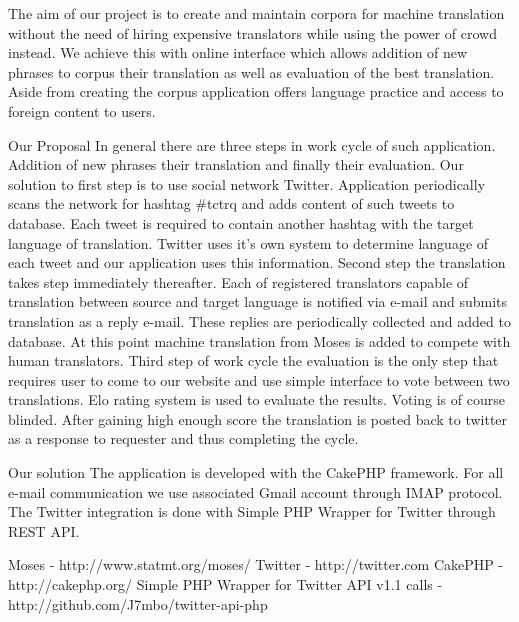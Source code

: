 The aim of our project is to create and maintain corpora for machine translation without the need of hiring expensive translators while using the power of crowd instead. We achieve this with online interface which allows addition of new phrases to corpus their translation as well as evaluation of the best translation. Aside from creating the corpus application offers language practice and access to foreign content to users.

Our Proposal
In general there are three steps in work cycle of such application. Addition of new phrases their translation and finally their evaluation. Our solution to first step is to use social network Twitter. Application periodically scans the network for hashtag #tctrq and adds content of such tweets to database. Each tweet is required to contain another hashtag with the target language of translation. Twitter uses it's own system to determine language of each tweet and our application uses this information. 
Second step the translation takes step immediately thereafter. Each of registered translators capable of translation between source and target language is notified via e-mail and submits translation as a reply e-mail. These replies are periodically collected and added to database. At this point machine translation from Moses is added to compete with human translators. 
Third step of work cycle the evaluation is the only step that requires user to come to our website and use simple interface to vote between two translations. Elo rating system is used to evaluate the results. Voting is of course blinded. After gaining high enough score the translation is posted back to twitter as a response to requester and thus completing the cycle. 

Our solution
The application is developed with the CakePHP framework. For all e-mail communication we use associated Gmail account through IMAP protocol. The Twitter integration is done with Simple PHP Wrapper for Twitter through REST API.

Moses - http://www.statmt.org/moses/
Twitter - http://twitter.com
CakePHP - http://cakephp.org/
Simple PHP Wrapper for Twitter API v1.1 calls - http://github.com/J7mbo/twitter-api-php

